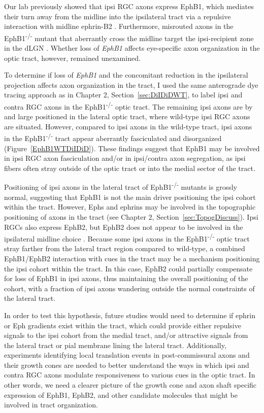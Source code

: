 Our lab previously showed that ipsi RGC axons express EphB1, which mediates their turn away from the midline into the ipsilateral tract via a repulsive interaction with midline ephrin-B2 \cite{williams2003ephrin,petros2009specificity}.
Furthermore, misrouted axons in the EphB1\textsuperscript{-/-} mutant that aberrantly cross the midline target the ipsi-recipient zone in the dLGN \cite{rebsam2009switching}.
Whether loss of \emph{EphB1} affects eye-specific axon organization in the optic tract, however, remained unexamined.

To determine if loss of \emph{EphB1} and the concomitant reduction in the ipsilateral projection affects axon organization in the tract, I used the same anterograde dye tracing approach as in Chapter 2, Section~\ref{sec:DiIDiDWT}, to label ipsi and contra RGC axons in the EphB1\textsuperscript{-/-} optic tract.
The remaining ipsi axons are by and large positioned in the lateral optic tract, where wild-type ipsi RGC axons are situated.
However, compared to ipsi axons in the wild-type tract, ipsi axons in the EphB1\textsuperscript{-/-} tract appear aberrantly fasciculated and disorganized (Figure~\ref{EphB1WTDiIDiD}).
These findings suggest that EphB1 may be involved in ipsi RGC axon fasciculation and/or in ipsi/contra axon segregation, as ipsi fibers often stray outside of the optic tract or into the medial sector of the tract.

Positioning of ipsi axons in the lateral tract of EphB1\textsuperscript{-/-} mutants is grossly normal, suggesting that EphB1 is not the main driver positioning the ipsi cohort within the tract.
However, Ephs and ephrins may be involved in the topographic positioning of axons in the tract (see Chapter 2, Section~\ref{sec:TopogDiscuss}).
Ipsi RGCs also express EphB2, but EphB2 does not appear to be involved in the ipsilateral midline choice \cite{williams2003ephrin,chenaux2011forward}.
Because some ipsi axons in the EphB1\textsuperscript{-/-} optic tract stray farther from the lateral tract region compared to wild-type, a combined EphB1/EphB2 interaction with cues in the tract may be a mechanism positioning the ipsi cohort within the tract.
In this case, EphB2 could partially compensate for loss of EphB1 in ipsi axons, thus maintaining the overall positioning of the cohort, with a fraction of ipsi axons wandering outside the normal constraints of the lateral tract.

In order to test this hypothesis, future studies would need to determine if ephrin or Eph gradients exist within the tract, which could provide either repulsive signals to the ipsi cohort from the medial tract, and/or attractive signals from the lateral tract or pial membrane lining the lateral tract.
Additionally, experiments identifying local translation events in post-commissural axons and their growth cones are needed to better understand the ways in which ipsi and contra RGC axons modulate responsiveness to various cues in the optic tract.
In other words, we need a clearer picture of the growth cone and axon shaft specific expression of EphB1, EphB2, and other candidate molecules that might be involved in tract organization.

